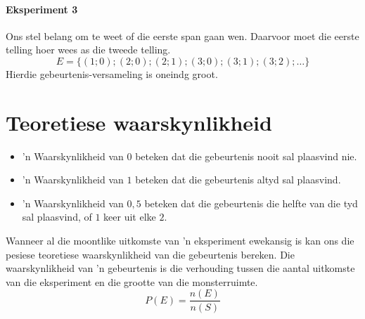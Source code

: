 
\paragraph{Eksperiment 3} Ons stel belang om te weet of die eerste span gaan wen. Daarvoor moet die eerste telling hoer wees as die tweede telling.
\[E=\{(1;0);(2;0);(2;1);(3;0);(3;1);(3;2);\ldots\}\]
Hierdie gebeurtenis-versameling is oneindg groot.


\section{Teoretiese waarskynlikheid}
\begin{itemize}
\item 'n Waarskynlikheid van $0$ beteken dat die gebeurtenis nooit sal plaasvind nie.
\item 'n Waarskynlikheid van $1$ beteken dat die gebeurtenis altyd sal plaasvind.
\item 'n Waarskynlikheid van $0,5$ beteken dat die gebeurtenis die helfte van die tyd sal plaasvind, of $1$ keer uit elke $2$.
\end{itemize}

Wanneer al die moontlike uitkomste van 'n eksperiment ewekansig is kan ons die pesiese teoretiese waarskynlikheid van die gebeurtenis bereken. Die waarskynlikheid van 'n gebeurtenis is die verhouding tussen die aantal uitkomste van die eksperiment en die grootte van die monsterruimte.
\[P(E) = \frac{n(E)}{n(S)}\]

